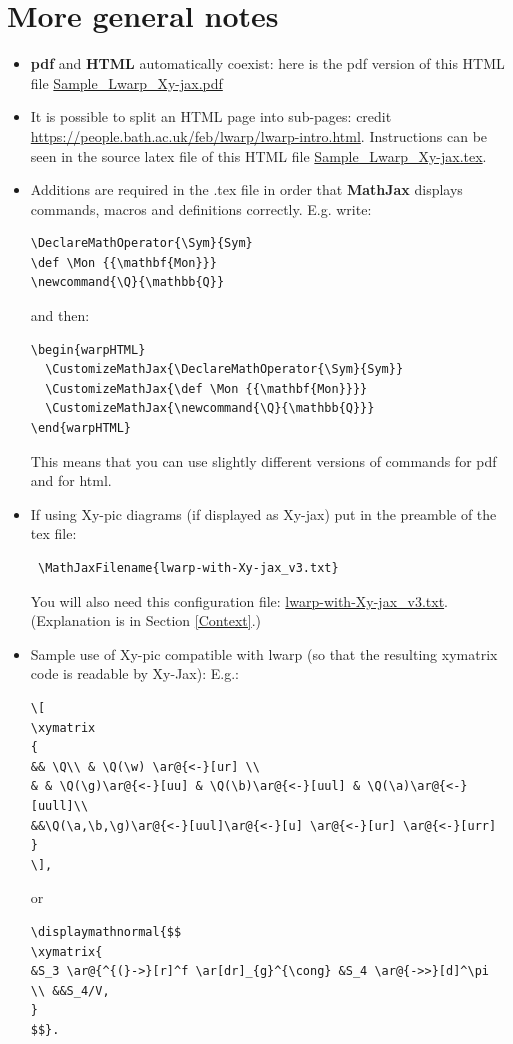 \documentclass[a4paper,12pt]{article}
\newtheorem{Fundamental Theorem}{Fundamental Theorem}
\DeclareMathOperator{\Sym}{Sym}
\newcommand{\Q}{\mathbb{Q}}
\renewcommand{\a}{{\alpha}}
\renewcommand{\b}{{\beta}}
\def \g {\gamma}
\def \w {\omega}
\begin{document}
\section{More general notes}
\begin{itemize}


\item \textbf{pdf} and \textbf{HTML} automatically coexist: here is the pdf version  of this HTML file \href{Sample_Lwarp_Xy-jax.pdf}{Sample\_Lwarp\_Xy-jax.pdf}

\item It is possible to split an HTML page into sub-pages: credit \url{https://people.bath.ac.uk/feb/lwarp/lwarp-intro.html}. Instructions can be seen in the source latex file of this HTML file  \href{Sample_Lwarp_Xy-jax.tex}{Sample\_Lwarp\_Xy-jax.tex}.

 \item Additions are required in the .tex file in order that \textbf{MathJax} displays commands, macros and definitions correctly.
        E.g. write:
\begin{verbatim}
\DeclareMathOperator{\Sym}{Sym}
\def \Mon {{\mathbf{Mon}}}
\newcommand{\Q}{\mathbb{Q}}
\end{verbatim}

and then:

\begin{verbatim}
\begin{warpHTML}
  \CustomizeMathJax{\DeclareMathOperator{\Sym}{Sym}}
  \CustomizeMathJax{\def \Mon {{\mathbf{Mon}}}}
  \CustomizeMathJax{\newcommand{\Q}{\mathbb{Q}}}
\end{warpHTML}
\end{verbatim}
This means that you can use slightly different versions of commands for pdf and for html.
\item If using Xy-pic diagrams (if displayed as Xy-jax) put in the preamble of the tex file:
\begin{verbatim}
 \MathJaxFilename{lwarp-with-Xy-jax_v3.txt}
\end{verbatim}
You will also need this configuration file: \href{lwarp-with-Xy-jax_v3.txt}{lwarp-with-Xy-jax\_v3.txt}.
(Explanation is in Section \ref{Context}.)


\item Sample use of Xy-pic compatible with lwarp (so that the resulting xymatrix code  is readable by Xy-Jax):
E.g.:
\begin{verbatim}
\[
\xymatrix
{
&& \Q\\ & \Q(\w) \ar@{<-}[ur] \\
& & \Q(\g)\ar@{<-}[uu] & \Q(\b)\ar@{<-}[uul] & \Q(\a)\ar@{<-}[uull]\\
&&\Q(\a,\b,\g)\ar@{<-}[uul]\ar@{<-}[u] \ar@{<-}[ur] \ar@{<-}[urr]
}
\],
\end{verbatim}
or
\begin{verbatim}
\displaymathnormal{$$
\xymatrix{
&S_3 \ar@{^{(}->}[r]^f \ar[dr]_{g}^{\cong} &S_4 \ar@{->>}[d]^\pi
\\ &&S_4/V,
}
$$}.
\end{verbatim}



\end{itemize}
\end{document}
